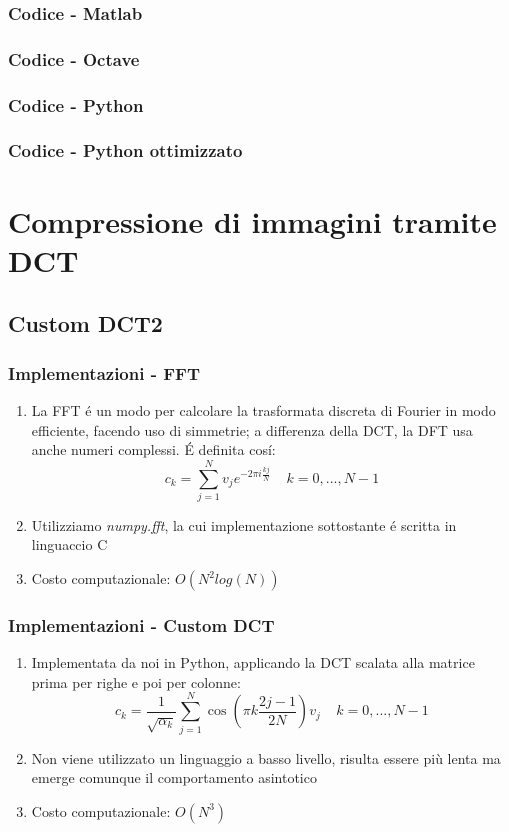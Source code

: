 \documentclass{beamer}
\begin{document}
\begin{frame}
	\frametitle{Codice - Matlab}
	
\end{frame}


\begin{frame}
	\frametitle{Codice - Octave}
	
\end{frame}


\begin{frame}
	\frametitle{Codice - Python}
	
\end{frame}


\begin{frame}
	\frametitle{Codice - Python ottimizzato}
	
\end{frame}

\section{Compressione di immagini tramite DCT}

\subsection{Custom DCT2}

\begin{frame}
\frametitle{Implementazioni - FFT}
\begin{enumerate}
\item La FFT \'e un modo per calcolare la trasformata discreta di Fourier in modo efficiente, facendo uso di simmetrie; a differenza della DCT, la DFT usa anche numeri complessi. \'E definita cos\'i:
\[c_k = \sum\limits_{j = 1}^N v_j e^{-2 \pi i \frac{kj}{N}} \;\;\;\; k = 0,...,N-1\]
\item Utilizziamo \textit{numpy.fft}, la cui implementazione sottostante \'e scritta in linguaccio C
\item Costo computazionale: $O(N^2log(N))$
\end{enumerate}
\end{frame}
\begin{frame}
\frametitle{Implementazioni - Custom DCT}
\begin{enumerate}
\item Implementata da noi in Python, applicando la DCT scalata alla matrice prima per righe e poi per colonne:
\[c_k = \frac{1}{\sqrt{\alpha_k}} \sum\limits_{j=1}^N \cos(\pi k \frac{2j - 1}{2N}) v_j \;\;\;\; k = 0,...,N-1\]
\item Non viene utilizzato un linguaggio a basso livello, risulta essere più lenta ma emerge comunque il comportamento asintotico
\item Costo computazionale: $O(N^3)$
\end{enumerate}
\end{frame}
\end{document}
